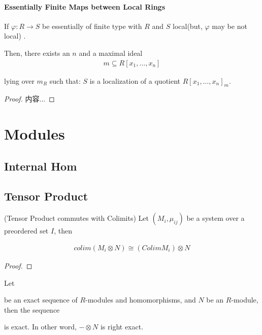 \documentclass[Total.tex]{subfiles}
\begin{document}
				\subsubsection{Essentially Finite Maps between Local Rings}
					\begin{lemma}
						If $\varphi:R\rightarrow S$ be essentially of finite type with $R$ and $S$ local(but, $\varphi$ may be not local) .
						
						Then, there exists an $n$ and a maximal ideal
						\begin{gather*}
							m\subseteq R[x_1,\dots,x_n]
						\end{gather*}
						
						lying over $m_R$ such that: $S$ is a localization of a quotient $R[x_1,\dots,x_n]_m$.
					\end{lemma}
					\begin{proof}
						内容...
					\end{proof}
	\chapter{Modules}
		\section{Internal Hom}
		\section{Tensor Product}
			
			\begin{Def}
			\end{Def}
			
			\begin{lemma}
				(Tensor Product commutes with Colimits) Let $(M_i,\mu_{ij})$ be a system over a preordered set $I$, then  
				
				\begin{gather*}
					colim(M_i\otimes N) \cong (Colim M_i)\otimes N
				\end{gather*}
			\end{lemma}
			
			\begin{proof}
			\end{proof}
			
			\begin{lemma}
				Let  be an exact sequence of $R$-modules and homomorphisms, and $N$ be an $R$-module, then the sequence
				
				\begin{center}
				\end{center}
				
				is exact. In other word, $-\otimes N$ is right exact.
			\end{lemma}
			
\end{document}
